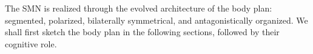 The SMN is realized through the evolved architecture of the body plan: segmented, polarized, 
bilaterally symmetrical, and antagonistically organized. We shall first sketch the body plan in the following sections, followed by their cognitive role. 

















